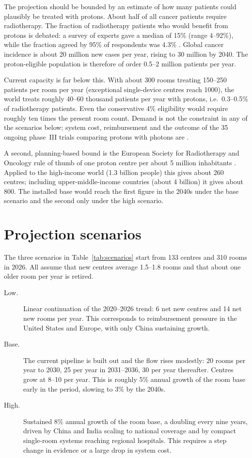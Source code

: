 \documentclass[11pt,a4paper]{article}
\begin{document}
The projection should be bounded by an estimate of how many patients could
plausibly be treated with protons. About half of all cancer patients require
radiotherapy. The fraction of radiotherapy patients who would benefit from
protons is debated: a survey of experts gave a median of 15\% (range 4--92\%),
while the fraction agreed by 95\% of respondents was 4.3\% \cite{bjr2022}.
Global cancer incidence is about 20 million new cases per year, rising to
30 million by 2040. The proton-eligible population is therefore of order
0.5--2 million patients per year.

Current capacity is far below this. With about 300 rooms treating 150--250
patients per room per year (exceptional single-device centres reach 1000), the
world treats roughly 40--60 thousand patients per year with protons, i.e.\
0.3--0.5\% of radiotherapy patients. Even the conservative 4\% eligibility would
require roughly ten times the present room count. Demand is not the constraint
in any of the scenarios below; system cost, reimbursement and the outcome of
the 35 ongoing phase~III trials comparing protons with photons are
\cite{iba_h1_26}.

A second, planning-based bound is the European Society for Radiotherapy and
Oncology rule of thumb of one proton centre per about 5 million inhabitants
\cite{estro2026}. Applied to the high-income world (1.3 billion people) this
gives about 260 centres; including upper-middle-income countries (about 4
billion) it gives about 800. The installed base would reach the first figure
in the 2040s under the base scenario and the second only under the high
scenario.

\section{Projection scenarios}
\label{sec:scenarios}

The three scenarios in Table~\ref{tab:scenarios} start from 133 centres and 310
rooms in 2026. All assume that new centres average 1.5--1.8 rooms and that
about one older room per year is retired.

\begin{description}
\item[Low.] Linear continuation of the 2020--2026 trend: 6 net new centres and
  14 net new rooms per year. This corresponds to reimbursement pressure in the
  United States and Europe, with only China sustaining growth.
\item[Base.] The current pipeline is built out and the flow rises modestly:
  20 rooms per year to 2030, 25 per year in 2031--2036, 30 per year thereafter.
  Centres grow at 8--10 per year. This is roughly 5\% annual growth of the room
  base early in the period, slowing to 3\% by the 2040s.
\item[High.] Sustained 8\% annual growth of the room base, a doubling every nine
  years, driven by China and India scaling to national coverage and by
  compact single-room systems reaching regional hospitals. This requires a
  step change in evidence or a large drop in system cost.
\end{description}
\end{document}
